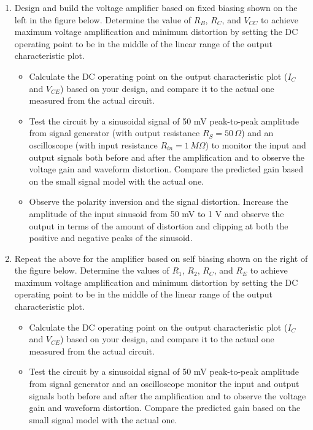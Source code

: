 \begin{enumerate}

\item Design and build the voltage amplifier based on fixed biasing
  shown on the left in the figure below. Determine the value of $R_B$,
  $R_C$, and $V_{CC}$ to achieve maximum voltage amplification and 
  minimum distortion by setting the DC operating point to be in the 
  middle of the linear range of the output characteristic plot. 
  
  \begin{itemize}
  \item Calculate the DC operating point on the output characteristic 
    plot ($I_{C}$ and $V_{CE}$) based on your design, and compare it
    to the actual one measured from the actual circuit. 

  \item Test the circuit by a sinusoidal signal of 50 mV peak-to-peak 
    amplitude from signal generator (with output resistance 
    $R_S=50\,\Omega$) and an oscilloscope (with input resistance
    $R_{in}=1\,M\Omega$) to monitor the input and output signals both 
    before and after the amplification and to observe the voltage gain 
    and waveform distortion. Compare the predicted gain based on the
    small signal model with the actual one.

  \item Observe the polarity inversion and the signal distortion. 
    Increase the amplitude of the input sinusoid from 50 mV to 1 V 
    and observe the output in terms of the amount of distortion and 
    clipping at both the positive and negative peaks of the sinusoid.
  \end{itemize}

\item Repeat the above for the amplifier based on self biasing shown 
  on the right of the figure below. Determine the values of $R_1$, 
  $R_2$, $R_C$, and $R_E$ to achieve maximum voltage amplification 
  and minimum distortion by setting the DC operating point to be in 
  the middle of the linear range of the output characteristic plot. 

  \begin{itemize}
  \item Calculate the DC operating point on the output characteristic 
    plot ($I_{C}$ and $V_{CE}$) based on your design, and compare it
    to the actual one measured from the actual circuit. 

  \item Test the circuit by a sinusoidal signal of 50 mV peak-to-peak 
    amplitude from signal generator and an oscilloscope monitor the 
    input and output signals both before and after the amplification 
    and to observe the voltage gain and waveform distortion. Compare 
    the predicted gain based on the small signal model with the actual 
    one.


\end{itemize}
\end{enumerate}
